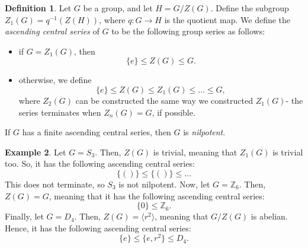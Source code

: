\documentclass[a4paper, openany]{memoir}
\theoremstyle{definition}
\newtheorem{definition}{Definition}[section]
\newtheorem{example}[definition]{Example}
\theoremstyle{plain}
\begin{document}
    \begin{definition}
        Let $G$ be a group, and let $H = G/Z(G)$. Define the subgroup $Z_1(G) = q^{-1}(Z(H))$, where $q \colon G \to H$ is the quotient map. We define the \emph{ascending central series} of $G$ to be the following group series as follows:
        \begin{itemize}
            \item if $G = Z_1(G)$, then
            \[\{e\} \leq Z(G) \leq G.\]
            \item otherwise, we define
            \[\{e\} \leq Z(G) \leq Z_1(G) \leq \dots \leq G,\]
            where $Z_2(G)$ can be constructed the same way we constructed $Z_1(G)$- the series terminates when $Z_n(G) = G$, if possible.
        \end{itemize}
        If $G$ has a finite ascending central series, then $G$ is \emph{nilpotent}.
    \end{definition}

    \begin{example}
        Let $G = S_3$. Then, $Z(G)$ is trivial, meaning that $Z_1(G)$ is trivial too. So, it has the following ascending central series:
        \[\{()\} \leq \{()\}  \leq \dots \]
        This does not terminate, so $S_3$ is not nilpotent. Now, let $G = \mathbb{Z}_6$. Then, $Z(G) = G$, meaning that it has the following ascending central series:
        \[\{0\} \leq \mathbb{Z}_6.\]
        Finally, let $G = D_4$. Then, $Z(G) = \langle r^2 \rangle$, meaning that $G/Z(G)$ is abelian. Hence, it has the following ascending central series:
        \[\{e\} \leq \{e, r^2\} \leq D_4.\]
    \end{example}
\end{document}
